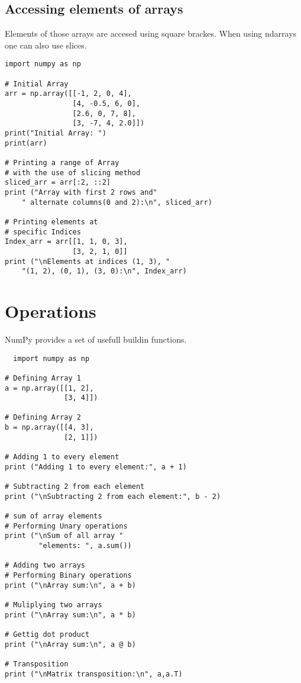 \documentclass{article}
\begin{document}
\subsection{Accessing elements of arrays}
Elements of those arrays are accesed using square brackes.
When using ndarrays one can also use slices.
\begin{lstlisting}
import numpy as np

# Initial Array
arr = np.array([[-1, 2, 0, 4],
                [4, -0.5, 6, 0],
                [2.6, 0, 7, 8],
                [3, -7, 4, 2.0]])
print("Initial Array: ")
print(arr)
  
# Printing a range of Array
# with the use of slicing method
sliced_arr = arr[:2, ::2]
print ("Array with first 2 rows and"
    " alternate columns(0 and 2):\n", sliced_arr)
  
# Printing elements at
# specific Indices
Index_arr = arr[[1, 1, 0, 3], 
                [3, 2, 1, 0]]
print ("\nElements at indices (1, 3), "
    "(1, 2), (0, 1), (3, 0):\n", Index_arr)
\end{lstlisting}
\section{Operations}
NumPy provides a set of usefull buildin functions.

\begin{lstlisting}
  import numpy as np

# Defining Array 1
a = np.array([[1, 2],
              [3, 4]])
  
# Defining Array 2
b = np.array([[4, 3],
              [2, 1]])
                
# Adding 1 to every element
print ("Adding 1 to every element:", a + 1)
  
# Subtracting 2 from each element
print ("\nSubtracting 2 from each element:", b - 2)
  
# sum of array elements
# Performing Unary operations
print ("\nSum of all array "
        "elements: ", a.sum())

# Adding two arrays
# Performing Binary operations
print ("\nArray sum:\n", a + b)

# Muliplying two arrays
print ("\nArray sum:\n", a * b)

# Gettig dot product
print ("\nArray sum:\n", a @ b)

# Transposition
print ("\nMatrix transposition:\n", a,a.T)
\end{lstlisting}
\end{document}
